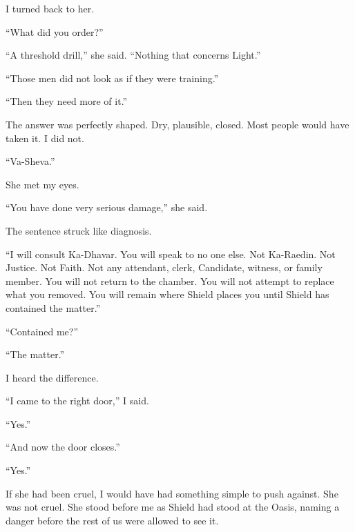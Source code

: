 I turned back to her.\par

``What did you order?''\par

``A threshold drill,'' she said. ``Nothing that concerns Light.''\par

``Those men did not look as if they were training.''\par

``Then they need more of it.''\par

The answer was perfectly shaped. Dry, plausible, closed. Most people would have taken it. I did not.\par

``Va-Sheva.''\par

She met my eyes.\par

``You have done very serious damage,'' she said.\par

The sentence struck like diagnosis.\par

``I will consult Ka-Dhavar. You will speak to no one else. Not Ka-Raedin. Not Justice. Not Faith. Not any attendant, clerk, Candidate, witness, or family member. You will not return to the chamber. You will not attempt to replace what you removed. You will remain where Shield places you until Shield has contained the matter.''\par

``Contained me?''\par

``The matter.''\par

I heard the difference.\par

``I came to the right door,'' I said.\par

``Yes.''\par

``And now the door closes.''\par

``Yes.''\par

If she had been cruel, I would have had something simple to push against. She was not cruel. She stood before me as Shield had stood at the Oasis, naming a danger before the rest of us were allowed to see it.\par


